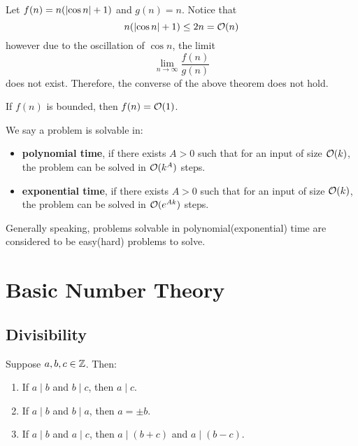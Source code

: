 \documentclass{article}
\begin{document}
\vspace{-0.2in}

\begin{xmp}[source=Primary Source Material]
Let $ f(n) = n(\abs{\cos n}+ 1) $ and $ g(n) = n $. Notice that
    \begin{equation*}
        n(\abs{\cos n} + 1) \leq 2n = \mathcal{O}(n)
    \end{equation*}
however due to the oscillation of $ \cos n $, the limit
\begin{equation*}
    \lim_{n \rightarrow \infty} \dfrac{f(n)}{g(n)}
\end{equation*}
does not exist. Therefore, the converse of the above theorem does not hold.
\end{xmp}

\begin{crll}
If $ f(n) $ is bounded, then $ f(n) = \mathcal{O}(1) $.
\end{crll}

\begin{defn}
We say a problem is solvable in:
\begin{itemize}
    \item \textbf{polynomial time}, if there exists $ A > 0 $ such that
        for an input of size $ \mathcal{O}(k) $, the problem can be solved in $ \mathcal{O}(k^{A}) $ steps.
    \item \textbf{exponential time}, if there exists $ A > 0 $ such that
        for an input of size $ \mathcal{O}(k) $, the problem can be solved in $ \mathcal{O}(e^{Ak}) $ steps.
\end{itemize}
\end{defn}

Generally speaking, problems solvable in polynomial(exponential) time are considered
to be easy(hard) problems to solve.

\newpage
\section{Basic Number Theory}
\subsection{Divisibility}

\begin{thm}
Suppose $ a, b, c \in \mathbb{Z} $. Then:
\begin{enumerate}
    \item If $ a \mid b $ and $ b \mid c $, then $ a \mid c $.
    \item If $ a \mid b $ and $ b \mid a $, then $ a = \pm b $.
    \item If $ a \mid b $ and $ a \mid c $, then $ a \mid (b + c) $ and $ a \mid (b - c) $.
\end{enumerate}
\end{thm}
\end{document}
